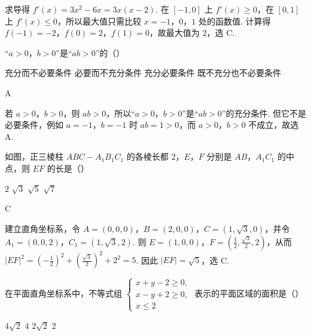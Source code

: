 \begin{solution}
求导得 \(f'(x)=3x^2-6x=3x(x-2)\). 在 \([-1,0]\) 上 \(f'(x)\geqslant0\)，在 \([0,1]\) 上 \(f'(x)\leqslant0\)，所以最大值只需比较 \(x=-1\)，\(0\)，\(1\) 处的函数值. 计算得 \(f(-1)=-2\)，\(f(0)=2\)，\(f(1)=0\)，故最大值为 \(2\)，选 C.
\end{solution}

\begin{problem}
“\(a > 0\)，\(b > 0\)”是“\(ab > 0\)”的（\quad）

\choices
    {充分而不必要条件}
    {必要而不充分条件}
    {充分必要条件}
    {既不充分也不必要条件}
\end{problem}

\begin{answer}
A
\end{answer}

\begin{solution}
若 \(a>0\)，\(b>0\)，则 \(ab>0\)，所以“\(a>0\)，\(b>0\)”是“\(ab>0\)”的充分条件. 但它不是必要条件，例如 \(a=-1\)，\(b=-1\) 时 \(ab=1>0\)，而 \(a>0\)，\(b>0\) 不成立，故选 A.
\end{solution}

\begin{problem}
如图，正三棱柱 \(ABC - A_{1}B_{1}C_{1}\) 的各棱长都 \(2\)，\(E\)，\(F\) 分别是 \(AB\)，\(A_{1}C_{1}\) 的中点，则 \(EF\) 的长是（\quad）


\choices
    {\(2\)}
    {\(\sqrt{3}\)}
    {\(\sqrt{5}\)}
    {\(\sqrt{7}\)}
\end{problem}

\begin{answer}
C
\end{answer}

\begin{solution}
建立直角坐标系，令 \(A=(0,0,0)\)，\(B=(2,0,0)\)，\(C=(1,\sqrt3,0)\)，并令 \(A_1=(0,0,2)\)，\(C_1=(1,\sqrt3,2)\). 则 \(E=(1,0,0)\)，\(F=\left(\frac12,\frac{\sqrt3}{2},2\right)\)，从而 \(\lvert EF\rvert^2=\left(-\frac12\right)^2+\left(\frac{\sqrt3}{2}\right)^2+2^2=5\). 因此 \(\lvert EF\rvert=\sqrt5\)，选 C.
\end{solution}

\begin{problem}
在平面直角坐标系中，不等式组 \(\begin{cases}
x+y-2\geqslant0,\\
x-y+2\geqslant0,\\
x\leqslant2
\end{cases}\) 表示的平面区域的面积是（\quad）

\choices
    {\(4\sqrt{2}\)}
    {\(4\)}
    {\(2\sqrt{2}\)}
    {\(2\)}
\end{problem}

